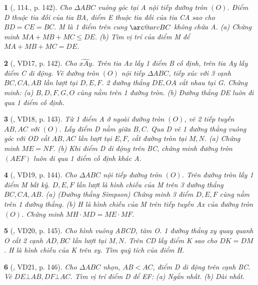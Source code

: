 \documentclass{article}
\makeatletter
\newcommand{\arc@char}{{\usefont{U}{tipa}{m}{n}\symbol{62}}}%
\newcommand{\arc}[1]{\mathpalette\arc@arc{#1}}
\newcommand{\arc@arc}[2]{%
	\sbox0{$\m@th#1#2$}%
	\vbox{
		\hbox{\resizebox{\wd0}{\height}{\arc@char}}
		\nointerlineskip
		\box0
	}%
}
\newtheorem{baitoan}{}
\makeatother
\begin{document}
\begin{baitoan}[\cite{Tuyen_Toan_9_old}, 114., p. 142]
	Cho $\Delta ABC$ vuông góc tại A nội tiếp đường tròn $(O)$. Điểm D thuộc tia đối của tia BA, điểm E thuộc tia đối của tia CA sao cho $BD = CE = BC$. M là 1 điểm trên cung $\arc{BC}$ không chứa A. (a) Chứng minh $MA + MB + MC\le DE$. (b) Tìm vị trí của điểm M để $MA + MB + MC = DE$.
\end{baitoan}

\begin{baitoan}[\cite{Tuyen_Toan_9_old}, VD17, p. 142]
	Cho $\widehat{xAy}$. Trên tia Ax lấy 1 điểm B cố định, trên tia Ay lấy điểm C di động. Vẽ đường tròn $(O)$ nội tiếp $\Delta ABC$, tiếp xúc với 3 cạnh $BC,CA,AB$ lần lượt tại $D,E,F$. 2 đường thẳng $DE,OA$ cắt nhau tại G. Chứng minh: (a) $B,D,F,G,O$ cùng nằm trên 1 đường tròn. (b) Đường thẳng DE luôn đi qua 1 điểm cố định.
\end{baitoan}

\begin{baitoan}[\cite{Tuyen_Toan_9_old}, VD18, p. 143]
	Từ 1 điểm A ở ngoài đường tròn $(O)$, vẽ 2 tiếp tuyến $AB,AC$ với $(O)$. Lấy điểm D nằm giữa $B,C$. Qua D vẽ 1 đường thẳng vuông góc với OD cắt $AB,AC$ lần lượt tại $E,F$, cắt đường tròn tại $M,N$. (a) Chứng minh $ME = NF$. (b) Khi điểm D di động trên BC, chứng minh đường tròn $(AEF)$ luôn đi qua 1 điểm cố định khác A.
\end{baitoan}

\begin{baitoan}[\cite{Tuyen_Toan_9_old}, VD19, p. 144]
	Cho $\Delta ABC$ nội tiếp đường tròn $(O)$. Trên đường tròn lấy 1 điểm M bất kỳ. $D,E,F$ lần lượt là hình chiếu của M trên 3 đường thẳng $BC,CA,AB$. (a) {\rm(Đường thẳng Simpson)} Chứng minh 3 điểm $D,E,F$ cùng nằm trên 1 đường thẳng. (b) H là hình chiếu của M trên tiếp tuyến Ax của đường tròn $(O)$. Chứng minh $MH\cdot MD = ME\cdot MF$.
\end{baitoan}

\begin{baitoan}[\cite{Tuyen_Toan_9_old}, VD20, p. 145]
	Cho hình vuông ABCD, tâm O. 1 đường thẳng xy quay quanh O cắt 2 cạnh $AD,BC$ lần lượt tại $M,N$. Trên CD lấy điểm K sao cho $DK = DM$. H là hình chiếu của K trên xy. Tìm quỹ tích của điểm H.
\end{baitoan}

\begin{baitoan}[\cite{Tuyen_Toan_9_old}, VD21, p. 146]
	Cho $\Delta ABC$ nhọn, $AB < AC$, điểm D di động trên cạnh BC. Vẽ $DE\bot AB,DF\bot AC$. Tìm vị trí điểm D để EF: (a) Ngắn nhất. (b) Dài nhất.
\end{baitoan}
\end{document}

